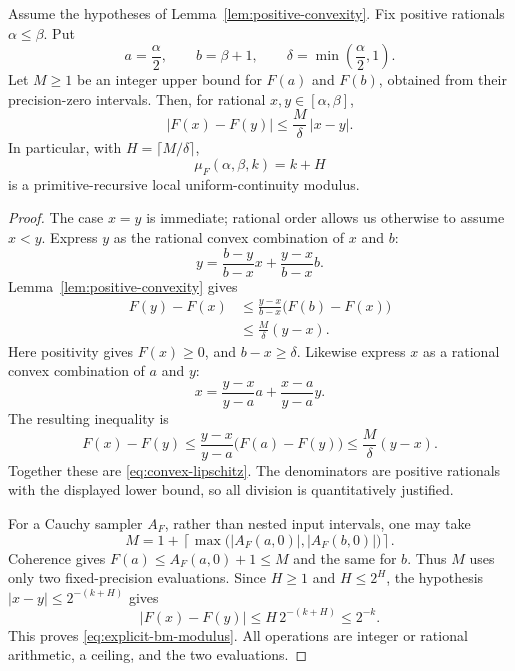 \begin{theorem}
\label{thm:convex-local-modulus}
Assume the hypotheses of Lemma~\ref{lem:positive-convexity}.  Fix
positive rationals $\alpha\le\beta$.  Put
\[
 a=\frac\alpha2,\qquad b=\beta+1,\qquad
 \delta=\min\left(\frac\alpha2,1\right).
\]
Let $M\ge1$ be an integer upper bound for $F(a)$ and $F(b)$,
obtained from their precision-zero intervals.  Then, for rational
$x,y\in[\alpha,\beta]$,
\begin{equation}
 |F(x)-F(y)|\le\frac M\delta\,|x-y|.
 \label{eq:convex-lipschitz}
\end{equation}
In particular, with $H=\lceil M/\delta\rceil$,
\begin{equation}
 \mu_F(\alpha,\beta,k)=k+H
 \label{eq:explicit-bm-modulus}
\end{equation}
is a primitive-recursive local uniform-continuity modulus.
\end{theorem}

\begin{proof}
The case $x=y$ is immediate; rational order allows us otherwise to
assume $x<y$.  Express $y$ as the rational convex combination of
$x$ and $b$:
\[
 y=\frac{b-y}{b-x}x+\frac{y-x}{b-x}b.
\]
Lemma~\ref{lem:positive-convexity} gives
\begin{align*}
 F(y)-F(x)
 &\le\frac{y-x}{b-x}\bigl(F(b)-F(x)\bigr)\\
 &\le\frac{M}{\delta}(y-x).
\end{align*}
Here positivity gives $F(x)\ge0$, and $b-x\ge\delta$.
Likewise express $x$ as a rational convex combination of $a$ and
$y$:
\[
 x=\frac{y-x}{y-a}a+\frac{x-a}{y-a}y.
\]
The resulting inequality is
\[
 F(x)-F(y)
 \le\frac{y-x}{y-a}\bigl(F(a)-F(y)\bigr)
 \le\frac M\delta(y-x).
\]
Together these are \eqref{eq:convex-lipschitz}.  The denominators
are positive rationals with the displayed lower bound, so all
division is quantitatively justified.

For a Cauchy sampler $A_F$, rather than nested input intervals, one
may take
\[
 M=1+\left\lceil\max\bigl(|A_F(a,0)|,|A_F(b,0)|\bigr)\right\rceil.
\]
Coherence gives $F(a)\le A_F(a,0)+1\le M$ and the same for $b$.
Thus $M$ uses only two fixed-precision evaluations.
Since $H\ge1$ and $H\le2^H$, the hypothesis
$|x-y|\le2^{-(k+H)}$ gives
\[
 |F(x)-F(y)|\le H\,2^{-(k+H)}\le2^{-k}.
\]
This proves \eqref{eq:explicit-bm-modulus}.  All operations are
integer or rational arithmetic, a ceiling, and the two evaluations.
\end{proof}

